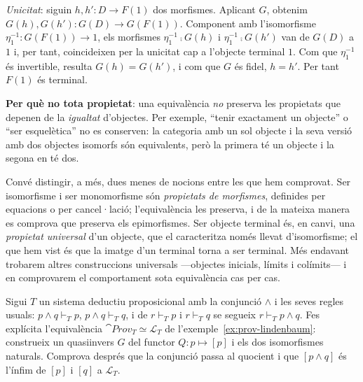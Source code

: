 \begin{solucio}
\emph{Unicitat}: siguin $h,h'\colon D\to F(1)$ dos morfismes. Aplicant $G$, obtenim $G(h),G(h')\colon G(D)\to G(F(1))$. Component amb l'isomorfisme $\eta_1^{-1}\colon G(F(1))\to 1$, els morfismes $\eta_1^{-1}\comp G(h)$ i $\eta_1^{-1}\comp G(h')$ van de $G(D)$ a $1$ i, per tant, coincideixen per la unicitat cap a l'objecte terminal $1$. Com que $\eta_1^{-1}$ és invertible, resulta $G(h)=G(h')$, i com que $G$ és fidel, $h=h'$. Per tant $F(1)$ és terminal.

\textbf{Per què no tota propietat}: una equivalència \emph{no} preserva les propietats que depenen de la \emph{igualtat} d'objectes. Per exemple, \enquote{tenir exactament un objecte} o \enquote{ser esquelètica} no es conserven: la categoria amb un sol objecte i la seva versió amb dos objectes isomorfs són equivalents, però la primera té un objecte i la segona en té dos.

Convé distingir, a més, dues menes de nocions entre les que hem comprovat. Ser isomorfisme i ser monomorfisme són \emph{propietats de morfismes}, definides per equacions o per cancel·lació; l'equivalència les preserva, i de la mateixa manera es comprova que preserva els epimorfismes. Ser objecte terminal és, en canvi, una \emph{propietat universal} d'un objecte, que el caracteritza només llevat d'isomorfisme; el que hem vist és que la imatge d'un terminal torna a ser terminal. Més endavant trobarem altres construccions universals ---objectes inicials, límits i colímits--- i en comprovarem el comportament sota equivalència cas per cas.
\end{solucio}


\begin{exercici}\label{pr-lindenbaum}
Sigui $T$ un sistema deductiu proposicional amb la conjunció $\land$ i les seves regles usuals: $p\land q\vdash_T p$, $p\land q\vdash_T q$, i de $r\vdash_T p$ i $r\vdash_T q$ se segueix $r\vdash_T p\land q$. Fes explícita l'equivalència $\cat{Prov}_T\simeq\mathcal L_T$ de l'exemple~\ref{ex:prov-lindenbaum}: construeix un quasiinvers $G$ del functor $Q\colon p\mapsto[p]$ i els dos isomorfismes naturals. Comprova després que la conjunció passa al quocient i que $[p\land q]$ és l'ínfim de $[p]$ i $[q]$ a $\mathcal L_T$.
\end{exercici}

